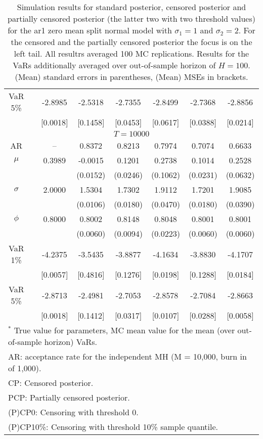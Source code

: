 {\begin{table}
\begin{tabular}{cc cccccc}
VaR 5\% && -2.8985 & -2.5318 & -2.7355 & -2.8499 & -2.7368 & -2.8856 \\ 
 && [0.0018] & [0.1458] & [0.0453] & [0.0617] & [0.0388] & [0.0214] \\ 
\hline 
\multicolumn{8}{c}{$T =10000$}  \\ 
\hline 
AR && -- & 0.8372 & 0.8213 & 0.7974 & 0.7074 & 0.6633 \\  
$\mu$&& 0.3989 & -0.0015 & 0.1201 & 0.2738 & 0.1014 & 0.2528 \\ 
&&   & (0.0152) & (0.0246) & (0.1062) & (0.0231) & (0.0632) \\ 
$\sigma$&& 2.0000 & 1.5304 & 1.7302 & 1.9112 & 1.7201 & 1.9085 \\ 
&&   & (0.0106) & (0.0180) & (0.0470) & (0.0180) & (0.0390) \\ 
$\phi$&& 0.8000 & 0.8002 & 0.8148 & 0.8048 & 0.8001 & 0.8001 \\ 
&&   & (0.0060) & (0.0094) & (0.0223) & (0.0060) & (0.0060) \\ 
VaR 1\% && -4.2375 & -3.5435 & -3.8877 & -4.1634 & -3.8830 & -4.1707 \\ 
  && [0.0057] & [0.4816] & [0.1276] & [0.0198] & [0.1288] & [0.0184] \\ 
VaR 5\% && -2.8713 & -2.4981 & -2.7053 & -2.8578 & -2.7084 & -2.8663 \\ 
 && [0.0018] & [0.1412] & [0.0317] & [0.0107] & [0.0288] & [0.0058] \\ 
\hline 
\multicolumn{8}{l}{\footnotesize{$^*$ True value for parameters, MC mean value for the mean (over out-of-sample horizon) VaRs.}}  \\ 
\multicolumn{8}{l}{\footnotesize{AR: acceptance rate for the independent MH (M = 10,000, burn in of 1,000).}}  \\ 
\multicolumn{8}{l}{\footnotesize{CP: Censored posterior.}}  \\ 
\multicolumn{8}{l}{\footnotesize{PCP: Partially censored posterior.}} \\ 
\multicolumn{8}{l}{\footnotesize{(P)CP0: Censoring with threshold 0.}} \\ 
\multicolumn{8}{l}{\footnotesize{(P)CP10\%: Censoring with threshold 10\% sample quantile.}}  \\ 
\end{tabular}
 \caption{Simulation results for standard posterior, censored posterior and partially censored posterior (the latter two with two threshold values) for the ar1 zero mean split normal model with $\sigma_{1} = 1$ and $\sigma_{2} = 2$. For the censored and the partially censored posterior the focus is on the left tail. All resultrs averaged 100 MC replications. Results for the VaRs additionally averaged over out-of-sample horizon of $H=100$. (Mean) standard errors in parentheses, (Mean) MSEs in brackets.} 
\label{tab:ar1_pcp}  
\end{table}
}